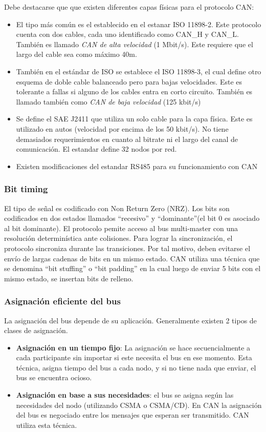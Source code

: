 Debe destacarse que que existen diferentes capas físicas para el protocolo CAN:
\begin{itemize}
\item El tipo más común es el establecido en el estanar ISO 11898-2. Este protocolo cuenta con dos cables, cada uno identificado como CAN\_H y CAN\_L. También es llamado \textit{CAN de alta velocidad} (1 Mbit/s). Este requiere que el largo del cable sea como máximo 40m.
\item También en el estándar de ISO se establece el ISO 11898-3, el cual define otro esquema de doble cable balanceado pero para bajas velocidades. Este es tolerante a fallas si alguno de los cables entra en corto circuito. También es llamado también como \textit{CAN de baja velocidad} (125 kbit/s)
\item Se define el SAE J2411 que utiliza un solo cable para la capa física. Este es utilizado en autos (velocidad por encima de los 50 kbit/s). No tiene demasiados requerimientos en cuanto al bitrate ni el largo del canal de comunicación. El estandar define 32 nodos por red.
\item Existen modificaciones del estandar RS485 para su funcionamiento con CAN
\end{itemize}

\subsubsection{Bit timing}
El tipo de señal es codificado con Non Return Zero (NRZ). Los bits son codificados en dos estados llamados ``recesivo'' y ``dominante''(el bit 0 es asociado al bit dominante). El protocolo pemite acceso al bus multi-master con una resolución determinística ante colisiones. Para lograr la sincronización, el protocolo sincroniza durante las transiciones. Por tal motivo, deben evitarse el envío de largas cadenas de bits en un mismo estado. CAN utiliza una técnica que se denomina ``bit stuffing'' o ``bit padding'' en la cual luego de enviar 5 bits con el mismo estado, se insertan bits de relleno.

\subsubsection{Asignación eficiente del bus}
La asignación del bus depende de su aplicación. Generalmente existen 2 tipos de clases de asignación.

\begin{itemize}
\item \textbf{Asignación en un tiempo fijo}: La asignación se hace secuencialmente a cada participante sin importar si este necesita el bus en ese momento. Esta técnica, asigna tiempo del bus a cada nodo, y si no tiene nada que enviar, el bus se encuentra ocioso.

\item \textbf{Asignación en base a sus necesidades}: el bus se asigna según las necesidades del nodo (utilizando CSMA o CSMA/CD). En CAN la asignación del bus es negociado entre los mensajes que esperan ser transmitido. CAN utiliza esta técnica.
\end{itemize}
